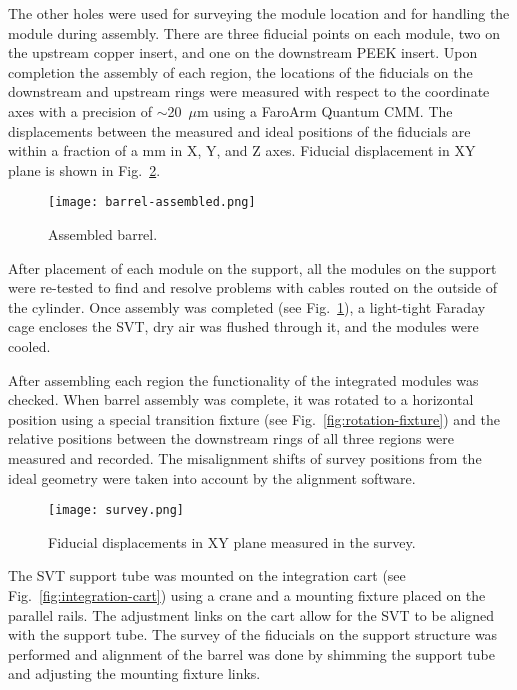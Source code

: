 The other holes were used for surveying the module location and for handling the module during assembly. There are three fiducial points on each module, two on the upstream copper insert, and one on the downstream PEEK insert. Upon completion the assembly of each region, the locations of the fiducials on the downstream and upstream rings were measured with respect to the coordinate axes with a precision of $\sim$20~$\mu$m using a FaroArm Quantum CMM. The displacements between the measured and ideal positions of the fiducials are within a fraction of a mm in X, Y, and Z axes. Fiducial displacement in XY plane is shown in Fig.~\ref{fig:survey}. 

\begin{figure}[hbt] 
\centering 
\texttt{[image: barrel-assembled.png]}
\caption{Assembled barrel.}
\label{fig:barrel-assembled}
\end{figure}

After placement of each module on the support, all the modules on the support were re-tested to find and resolve problems with cables routed on the outside of the cylinder. Once assembly was completed (see Fig.~\ref{fig:barrel-assembled}), a light-tight Faraday cage encloses the SVT, dry air was flushed through it, and the modules were cooled. 

After assembling each region the functionality of the integrated modules was checked. When barrel assembly was complete, it was rotated to a horizontal position using a special transition fixture (see Fig.~\ref{fig:rotation-fixture}) and the relative positions between the downstream rings of all three regions were measured and recorded. The misalignment shifts of survey positions from the ideal geometry were taken into account by the alignment software. 

\begin{figure}[hbt]
\centering 
\texttt{[image: survey.png]}
\caption{Fiducial displacements in XY plane measured in the survey.}
\label{fig:survey}
\end{figure}

The SVT support tube was mounted on the integration cart (see Fig.~\ref{fig:integration-cart}) using a crane and a mounting fixture placed on the parallel rails. The adjustment links on the cart allow for the SVT to be aligned with the support tube. The survey of the fiducials on the support structure was performed and alignment of the barrel was done by shimming the support tube and adjusting the mounting fixture links. 


